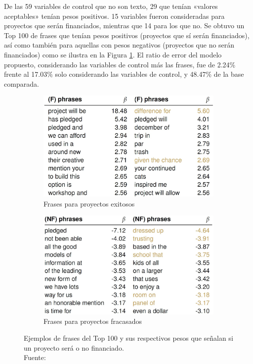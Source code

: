 De las 59 variables de control que no son texto, 29 que tenían «valores aceptables» tenían pesos positivos. 15 variables fueron consideradas para proyectos que serán financiados, mientras que 14 para los que no. Se obtuvo un Top 100 de frases que tenían pesos positivos (proyectos que sí serán financiados), así como también para aquellas con pesos negativos (proyectos que no serán financiados) como se ilustra en la Figura \ref{2:fig112}. El ratio de error del modelo propuesto, considerando las variables de control más las frases, fue de 2.24\% frente al 17.03\% solo considerando las variables de control, y 48.47\% de la base comparada.

\begin{figure}[!ht]
	\centering
	\small
	\begin{subfigure}{.5\textwidth}
		\centering
		\includegraphics[width=0.85\linewidth]{2/figures/mitra2014_resultadoA.jpg}
		\caption{Frases para proyectos exitosos}
	\end{subfigure}%
	\begin{subfigure}{.5\textwidth}
		\centering
		\includegraphics[width=0.85\linewidth]{2/figures/mitra2014_resultadoB.jpg}
		\caption{Frases para proyectos fracasados}
	\end{subfigure}
	\caption[Ejemplos de frases del Top 100 y sus respectivos pesos que señalan si un proyecto será o no financiado]{Ejemplos de frases del Top 100 y sus respectivos pesos que señalan si un proyecto será o no financiado.\\
		Fuente: \cite{pr_mitra2014phrases}}
	\label{2:fig112}
\end{figure}

